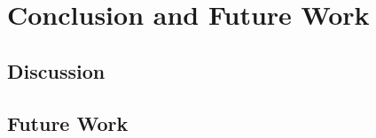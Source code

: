 \chapter{Conclusion and Future Work}\label{chapter:conclusion}

\section{Discussion}
\section{Future Work}
